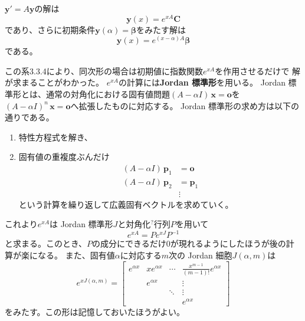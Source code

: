 \documentclass[report]{jlreq}
\begin{document}
\begin{corollary}[3.3.4 同次形の一般解と初期値問題]
    $\bm{y}' = A\bm{y}$の解は
    \begin{equation}
        \bm{y}(x) = e^{xA} \bm{C}
    \end{equation}
    であり、さらに初期条件$\bm{y}(\alpha) = \bm{\beta}$をみたす解は
    \begin{equation}
        \bm{y}(x) = e^{(x - \alpha)A} \bm{\beta}
    \end{equation}
    である。
\end{corollary}

この系3.3.4により、同次形の場合は初期値に指数関数$e^{xA}$を作用させるだけで
解が求まることがわかった。
$e^{xA}$の計算には\textbf{Jordan 標準形}を用いる。
Jordan 標準形とは、通常の対角化における固有値問題$(A - \alpha I)\, \bm{x} = \bm{o}$を
$(A - \alpha I)^n\, \bm{x} = \bm{o}$へ拡張したものに対応する。
Jordan 標準形の求め方は以下の通りである。
\begin{enumerate}
    \item 特性方程式を解き、
    \item 固有値の重複度ぶんだけ
        \begin{equation}
            \begin{split}
                (A - \alpha I)\, \bm{p}_{1} &= \bm{o} \\
                (A - \alpha I)\, \bm{p}_{2} &= \bm{p}_1 \\
                &\vdots
            \end{split}
        \end{equation}
        という計算を繰り返して広義固有ベクトルを求めていく。
\end{enumerate}
これより$e^{xA}$は Jordan 標準形$J$と対角化$\!{}^\text{?}\!$行列$P$を用いて
\begin{equation}
    e^{xA} = P e^{xJ} P^{-1}
\end{equation}
と求まる。このとき、$P$の成分にできるだけ$0$が現れるようにしたほうが後の計算が楽になる。
また、固有値$\alpha$に対応する$m$次の Jordan 細胞$J(\alpha, m)$は
\begin{equation}
    e^{x J(\alpha, m)}
        = \begin{bmatrix}
            e^{\alpha x} & xe^{\alpha x} & \cdots & \tfrac{x^{m-1}}{(m-1)!} e^{\alpha x} \\
             & e^{\alpha x} & & \vdots \\
             & & \ddots & \vdots \\
             & & & e^{\alpha x}
        \end{bmatrix}
\end{equation}
をみたす。この形は記憶しておいたほうがよい。
\end{document}
